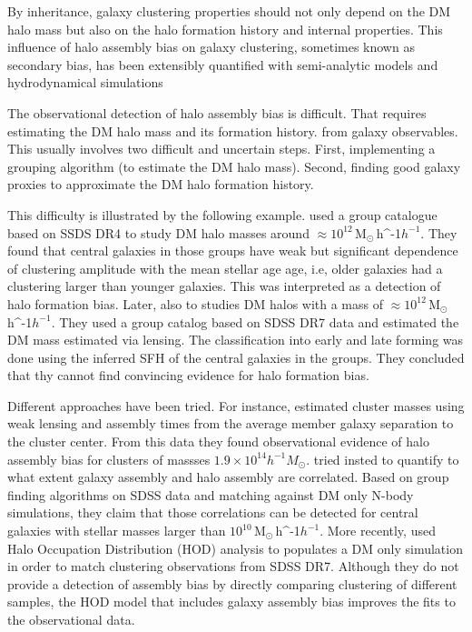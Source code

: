 \documentclass[fleqn,usenatbib]{mnras}
\newcommand{\Msunh}{\,{\rm M}$_{\odot}$\,\ifmmode h^{-1}\else $h^{-1}$\fi}
\begin{document}
By inheritance, galaxy clustering properties should not only depend on
the DM halo mass but also on the halo formation history and internal
properties.
This influence of halo assembly bias on galaxy clustering, sometimes known as
secondary bias, has been extensibly quantified with semi-analytic models 
\citep{2007MNRAS.374.1303C,2014ApJ...794...74J,2019MNRAS.484.1133C}
and hydrodynamical simulations \citep{2018MNRAS.480.3978A,2020MNRAS.tmp.1844M}

The observational detection of halo assembly bias is difficult.
That requires estimating the DM halo mass and its formation history.
from galaxy observables.
This usually involves two difficult and uncertain steps.
First, implementing a grouping algorithm (to estimate the DM halo
mass). 
Second, finding good galaxy proxies to approximate the DM halo
formation history.   

This difficulty is illustrated by the following example.
\citet{Lacerna_2014} used a group catalogue based on SSDS DR4
to study DM halo masses around $\approx 10^{12}$\Msunh. 
They found that central galaxies in those groups have weak but
significant dependence of clustering amplitude with the mean stellar
age age, i.e, older galaxies had a clustering larger than younger
galaxies. This was interpreted as a detection of halo formation bias.
Later, \citet{2016ApJ...819..119L} also to studies DM halos with a
mass of $\approx 10^{12}$\Msunh. 
They used a group catalog based on SDSS DR7 data  and estimated the DM
mass estimated via lensing.
The classification into early and late forming was done using  the
inferred SFH of the central galaxies in the groups.  
They concluded that thy cannot find convincing evidence for halo
formation bias.  


Different approaches have been tried.
For instance, \citet{2016PhRvL.116d1301M} estimated cluster masses using weak lensing and
assembly times from the average member galaxy separation to the cluster center. 
From this data they found observational evidence of halo assembly bias
for clusters of massses $1.9\times 10^{14}h^{-1}M_\odot$.
\citet{2018MNRAS.478.4487T} tried insted to quantify to what extent
galaxy assembly and halo assembly are correlated.
Based on group finding algorithms on SDSS data and matching against DM only N-body simulations,
they claim that those correlations can be detected for central
galaxies with stellar masses larger than $10^{10}$\Msunh.
More recently, \citet{2019MNRAS.485.1196Z} used Halo Occupation
Distribution (HOD) analysis to populates a DM only simulation in order
to match clustering observations from SDSS DR7. 
Although they do not provide a detection of assembly bias by directly
comparing clustering of different samples, 
the HOD model that includes galaxy assembly bias improves the fits to
the observational data. 
\end{document}
